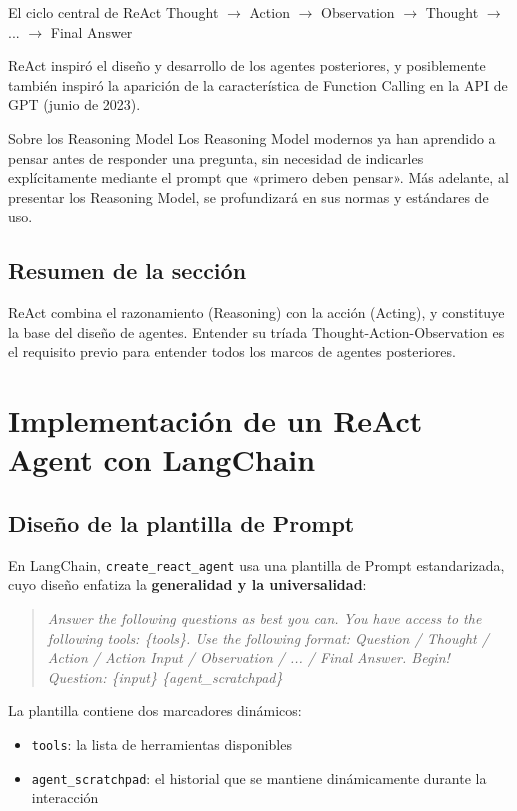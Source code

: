 \documentclass[a4paper]{article}
\begin{document}
\begin{importantbox}{El ciclo central de ReAct}
Thought $\rightarrow$ Action $\rightarrow$ Observation $\rightarrow$ Thought $\rightarrow$ ... $\rightarrow$ Final Answer

ReAct inspiró el diseño y desarrollo de los agentes posteriores, y posiblemente también inspiró la aparición de la característica de Function Calling en la API de GPT (junio de 2023).
\end{importantbox}

\begin{knowledgebox}{Sobre los Reasoning Model}
Los Reasoning Model modernos ya han aprendido a pensar antes de responder una pregunta, sin necesidad de indicarles explícitamente mediante el prompt que «primero deben pensar». Más adelante, al presentar los Reasoning Model, se profundizará en sus normas y estándares de uso.
\end{knowledgebox}

\subsection{Resumen de la sección}
ReAct combina el razonamiento (Reasoning) con la acción (Acting), y constituye la base del diseño de agentes. Entender su tríada Thought-Action-Observation es el requisito previo para entender todos los marcos de agentes posteriores.

\section{Implementación de un ReAct Agent con LangChain}

\subsection{Diseño de la plantilla de Prompt}

En LangChain, \texttt{create\_react\_agent} usa una plantilla de Prompt estandarizada, cuyo diseño enfatiza la \textbf{generalidad y la universalidad}:

\begin{quote}
\textit{Answer the following questions as best you can. You have access to the following tools: \{tools\}. Use the following format: Question / Thought / Action / Action Input / Observation / ... / Final Answer. Begin! Question: \{input\} \{agent\_scratchpad\}}
\end{quote}

La plantilla contiene dos marcadores dinámicos:
\begin{itemize}
    \item \texttt{tools}: la lista de herramientas disponibles
    \item \texttt{agent\_scratchpad}: el historial que se mantiene dinámicamente durante la interacción
\end{itemize}
\end{document}
